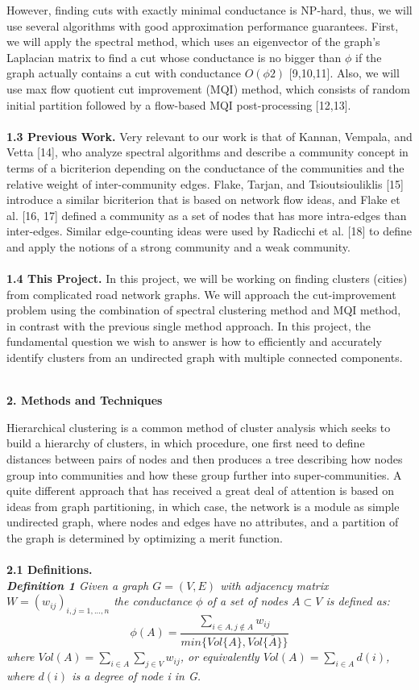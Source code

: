 \documentclass[12pt]{article}
\begin{document}
However, finding cuts with exactly minimal conductance is NP-hard, thus, we will use several algorithms with good approximation performance guarantees. First, we will apply the spectral method, which uses an eigenvector of the graph’s Laplacian matrix to find a cut whose conductance is no bigger than $\phi$ if the graph actually contains a cut with conductance $O(\phi2)$ [9,10,11]. Also, we will use max flow quotient cut improvement (MQI) method, which consists of random initial partition followed by a flow-based MQI post-processing [12,13]. \\\\
\textbf{1.3 Previous Work.} Very relevant to our work is that of Kannan, Vempala, and Vetta [14], who analyze spectral algorithms and describe a community concept in terms of a bicriterion depending on the conductance of the communities and the relative weight of inter-community edges. Flake, Tarjan, and Tsioutsiouliklis [15] introduce a similar bicriterion that is based on network flow ideas, and Flake et al. [16, 17] defined a community as a set of nodes that has more intra-edges than inter-edges. Similar edge-counting ideas were used by Radicchi et al. [18] to define and apply the notions of a strong community and a weak community.\\\\
\textbf{1.4 This Project.} In this project, we will be working on finding clusters (cities) from complicated road network graphs. We will approach the cut-improvement problem using the combination of spectral clustering method and MQI method, in contrast with the previous single method approach. In this project, the fundamental question we wish to answer is how to efficiently and accurately identify clusters from an undirected graph with multiple connected components.\\\\
\begin{center}
{\Large \textbf{2. Methods and Techniques}}
\end{center}
Hierarchical clustering is a common method of cluster analysis which seeks to build a hierarchy of clusters, in which procedure, one first need to define distances between pairs of nodes and then produces a tree describing how nodes group into communities and how these group further into super-communities. A quite different approach that has received a great deal of attention is based on
ideas from graph partitioning, in which case, the network is a module as simple undirected graph,
where nodes and edges have no attributes, and a partition of the graph is determined by optimizing a merit function. \\\\
\textbf{2.1 Definitions.}\\
\textit{\textbf{Definition 1} Given a graph $G = (V, E)$ with adjacency matrix  $W =(w_{ij})_{i,j=1,...,n}$ the conductance $\phi$ of a set of nodes $A\subset V$ is defined as:
$$\phi(A)=\frac{\sum_{i\in A,j\not\in A}w_{ij}}{min\{Vol\{A\},Vol\{\bar{A}\}\}}$$
where $Vol(A)=\sum_{i\in A}\sum_{j\in V}w_{ij}$, or equivalently $Vol(A)=\sum_{i\in A}d(i)$, where $d(i)$ is a degree of node i in G.}\\
\end{document}
